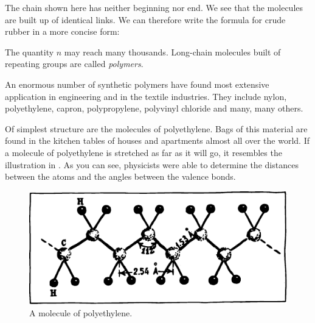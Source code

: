 
The chain shown here has neither beginning nor end. We see that the molecules are built up of identical links. We can therefore write the formula for crude rubber in a more concise form:
\begin{center}
{\scriptsize
\chemleft[\chemfig{-CH_{2}-C(-[:270]CH_{3})=CH-CH_{2}@{c2}-}\chemright]\par}
\end{center}

The quantity $n$ may reach many thousands. Long-chain molecules built of repeating groups are called \emph{polymers}. 

An enormous number of synthetic polymers have found most extensive application in engineering and in the textile industries. They include nylon, polyethylene, capron, polypropylene, polyvinyl chloride and many, many others.

Of simplest structure are the molecules of polyethylene. Bags of this material are found in the kitchen tables of houses and apartments almost all over the world. If a molecule of polyethylene is stretched as far as it will go, it resembles the illustration in . As you can see, physicists were able to determine the distances between the atoms and the angles between the valence bonds.

\begin{figure}[!ht]
\centering
\includegraphics[width=\textwidth]{figures/fig-09-01.pdf}
\caption{A molecule of polyethylene.}
\label{fig-9.1}
\end{figure}

